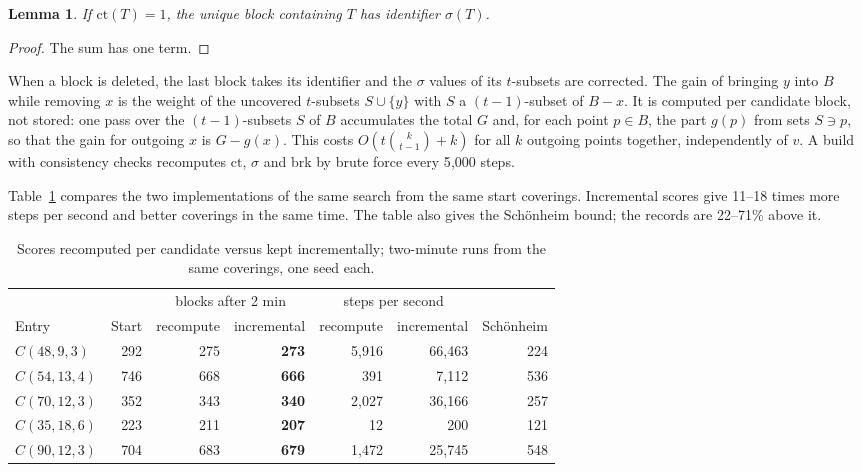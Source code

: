 \documentclass[11pt]{article}
\newtheorem{lemma}{Lemma}
\theoremstyle{remark}
\newcommand{\cov}{\mathrm{ct}}
\begin{document}
\begin{lemma}
If $\cov(T)=1$, the unique block containing $T$ has identifier $\sigma(T)$.
\end{lemma}
\begin{proof}
The sum has one term.
\end{proof}

When a block is deleted, the last block takes its identifier and the $\sigma$ values of its $t$-subsets are corrected.
The gain of bringing $y$ into $B$ while removing $x$ is the weight of the uncovered $t$-subsets $S\cup\{y\}$ with $S$ a
$(t-1)$-subset of $B-x$. It is computed per candidate block, not stored: one pass over the $(t-1)$-subsets $S$ of $B$
accumulates the total $G$ and, for each point $p\in B$, the part $g(p)$ from sets $S\ni p$, so that the gain for
outgoing $x$ is $G-g(x)$. This costs $O(t\binom{k}{t-1}+k)$ for all $k$ outgoing points together, independently of
$v$. A build with consistency checks recomputes $\cov$, $\sigma$ and brk by brute force every 5{,}000 steps.

Table~\ref{tab:v1v2} compares the two implementations of the same search from the same start coverings. Incremental
scores give 11--18 times more steps per second and better coverings in the same time. The table also gives the
Sch\"onheim bound; the records are 22--71\% above it.

\begin{table}[t]
\centering
\begin{tabular}{lrrrrrr}
\toprule
 & & \multicolumn{2}{c}{blocks after 2 min} & \multicolumn{2}{c}{steps per second} & \\
\cmidrule(lr){3-4}\cmidrule(lr){5-6}
Entry & Start & recompute & incremental & recompute & incremental & Sch\"onheim \\
\midrule
$C(48,9,3)$ & 292 & 275 & \textbf{273} & 5{,}916 & 66{,}463 & 224 \\
$C(54,13,4)$ & 746 & 668 & \textbf{666} & 391 & 7{,}112 & 536 \\
$C(70,12,3)$ & 352 & 343 & \textbf{340} & 2{,}027 & 36{,}166 & 257 \\
$C(35,18,6)$ & 223 & 211 & \textbf{207} & 12 & 200 & 121 \\
$C(90,12,3)$ & 704 & 683 & \textbf{679} & 1{,}472 & 25{,}745 & 548 \\
\bottomrule
\end{tabular}
\caption{Scores recomputed per candidate versus kept incrementally; two-minute runs from the same coverings, one seed
each.}
\label{tab:v1v2}
\end{table}
\end{document}
